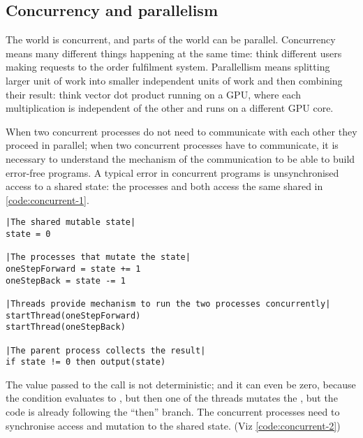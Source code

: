 \subsection{Concurrency and parallelism}
The world is concurrent, and parts of the world can be parallel. Concurrency means many different things happening at the same time: think different users making requests to the order fulfilment system. Parallellism means splitting larger unit of work into smaller independent units of work and then combining their result: think vector dot product running on a GPU, where each multiplication is independent of the other and runs on a different GPU core. 


When two concurrent processes do not need to communicate with each other they proceed in parallel; when two concurrent processes have to communicate, it is necessary to understand the mechanism of the communication to be able to build error-free programs. A typical error in concurrent programs is unsynchronised access to a shared state: the processes  and  both access the same shared  in \autoref{code:concurrent-1}.

\begin{lstlisting}[caption={Shared mutable state}, label={code:concurrent-1}, language=Pseudo, escapechar=|]
|The shared mutable state|
state = 0

|The processes that mutate the state|
oneStepForward = state += 1
oneStepBack = state -= 1

|Threads provide mechanism to run the two processes concurrently|
startThread(oneStepForward)
startThread(oneStepBack)

|The parent process collects the result|
if state != 0 then output(state)
\end{lstlisting}

The value passed to the  call is not deterministic; and it can even be zero, because the  condition evaluates to , but then one of the threads mutates the , but the code is already following the ``then'' branch. The concurrent processes need to synchronise access and mutation to the shared state. (Viz \autoref{code:concurrent-2})

